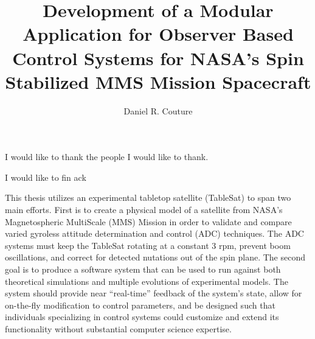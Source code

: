 \documentclass[11pt,doublespace]{unhthesis}
\begin{document}
\title{Development of a Modular Application for Observer Based Control Systems for NASA's Spin Stabilized MMS Mission Spacecraft}
\author{Daniel R. Couture}
\maketitle

\makecopyright

\makeapproval

\begin{dedication}
  I would like to thank the people I would like to thank.
\end{dedication}

\begin{acknowledgments}
    I would like to fin ack
\end{acknowledgments}

\begin{singlespace}
  \tableofcontents
  \listoftables
  \listoffigures
\end{singlespace}

\begin{abstractpage}
This thesis utilizes an experimental tabletop satellite (TableSat) to span two main efforts.  First is to create a physical model of a satellite from NASA's Magnetospheric MultiScale (MMS) Mission in order to validate and compare varied gyroless attitude determination and control (ADC) techniques.  The ADC systems must keep the TableSat rotating at a constant 3 rpm, prevent boom oscillations, and correct for detected nutations out of the spin plane.  The second goal is to produce a software system that can be used to run against both theoretical simulations and multiple evolutions of experimental models.  The system should provide near ``real-time'' feedback of the system's state, allow for on-the-fly modification to control parameters, and be designed such that individuals specializing in control systems could customize and extend its functionality without substantial computer science expertise.
\end{abstractpage}
\end{document}
